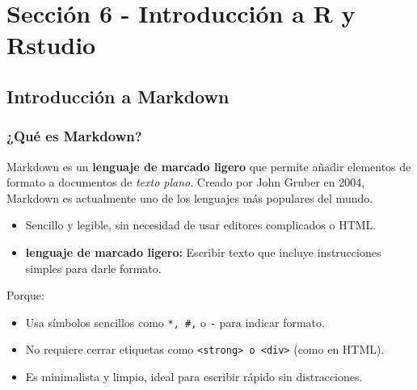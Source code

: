 \documentclass[
  spanish,
  12pt,
  letterpaper,
  DIV=11,
  numbers=noendperiod]{scrreprt}
\providecommand{\tightlist}{%
  \setlength{\itemsep}{0pt}\setlength{\parskip}{0pt}}
\begin{document}
\part{\textbf{Sección 6} - Introducción a R y Rstudio}

\chapter{Introducción a Markdown}\label{introducciuxf3n-a-markdown}

\section{¿Qué es Markdown?}\label{quuxe9-es-markdown}

Markdown es un \textbf{lenguaje de marcado ligero} que permite añadir
elementos de formato a documentos de \emph{texto plano}. Creado por John
Gruber en 2004, Markdown es actualmente uno de los lenguajes más
populares del mundo.

\begin{itemize}
\tightlist
\item
  Sencillo y legible, sin necesidad de usar editores complicados o HTML.
\item
  \textbf{lenguaje de marcado ligero:} Escribir texto que incluye
  instrucciones simples para darle formato.
\end{itemize}

\begin{tcolorbox}[enhanced jigsaw, arc=.35mm, bottomrule=.15mm, bottomtitle=1mm, breakable, colback=white, colbacktitle=quarto-callout-note-color!10!white, colframe=quarto-callout-note-color-frame, coltitle=black, left=2mm, leftrule=.75mm, opacityback=0, opacitybacktitle=0.6, rightrule=.15mm, title=\textcolor{quarto-callout-note-color}{\faInfo}\hspace{0.5em}{🧩 ¿Por qué se llama ``ligero''?}, titlerule=0mm, toprule=.15mm, toptitle=1mm]

Porque:

\begin{itemize}
\tightlist
\item
  Usa símbolos sencillos como \texttt{*,\ \#,} o \texttt{-} para indicar
  formato.
\item
  No requiere cerrar etiquetas como
  \texttt{\textless{}strong\textgreater{}\ o\ \textless{}div\textgreater{}}
  (como en HTML).
\item
  Es minimalista y limpio, ideal para escribir rápido sin distracciones.
\end{itemize}

\end{tcolorbox}
\end{document}
